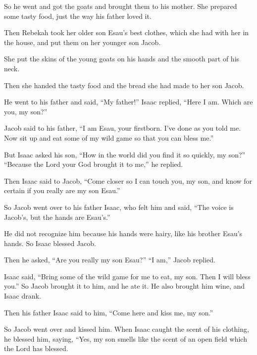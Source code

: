 \begin{scripture}
 So he went and got the goats and brought them to his mother. She prepared some tasty food, just the way his father loved it.
 Then Rebekah took her older son Esau's best clothes, which she had with her in the house, and put them on her younger son Jacob.
 She put the skins of the young goats on his hands and the smooth part of his neck.
 Then she handed the tasty food and the bread she had made to her son Jacob.
\everypar{}

 He went to his father and said, ``My father!'' Isaac replied, ``Here I am. Which are you, my son?''
 Jacob said to his father, ``I am Esau, your firstborn. I've done as you told me. Now sit up and eat some of my wild game so that you can bless me.''
 But Isaac asked his son, ``How in the world did you find it so quickly, my son?'' ``Because the Lord your God brought it to me,'' he replied.
 Then Isaac said to Jacob, ``Come closer so I can touch you, my son, and know for certain if you really are my son Esau.''
 So Jacob went over to his father Isaac, who felt him and said, ``The voice is Jacob's, but the hands are Esau's.''
 He did not recognize him because his hands were hairy, like his brother Esau's hands. So Isaac blessed Jacob.
 Then he asked, ``Are you really my son Esau?'' ``I am,'' Jacob replied.
 Isaac said, ``Bring some of the wild game for me to eat, my son. Then I will bless you.'' So Jacob brought it to him, and he ate it. He also brought him wine, and Isaac drank.
 Then his father Isaac said to him, ``Come here and kiss me, my son.''
\everypar{}

 So Jacob went over and kissed him. When Isaac caught the scent of his clothing, he blessed him, saying, ``Yes, my son smells like the scent of an open field which the Lord has blessed.
\everypar{}


\end{scripture}
